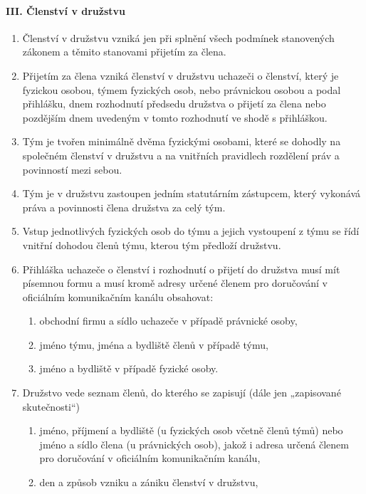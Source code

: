 \paragraph{III. Členství v družstvu}
\begin{enumerate}
    \item Členství v družstvu vzniká jen při splnění všech podmínek stanovených zákonem a těmito stanovami přijetím za člena.
    \item Přijetím za člena vzniká členství v družstvu uchazeči o členství, který je fyzickou osobou, týmem fyzických osob, nebo právnickou osobou a podal přihlášku, dnem rozhodnutí předsedu družstva o přijetí za člena nebo pozdějším dnem uvedeným v tomto rozhodnutí ve shodě s přihláškou.
    \item Tým je tvořen minimálně dvěma fyzickými osobami, které se dohodly na společném členství v družstvu a na vnitřních pravidlech rozdělení práv a povinností mezi sebou.
    \item Tým je v družstvu zastoupen jedním statutárním zástupcem, který vykonává práva a povinnosti člena družstva za celý tým.
    \item Vstup jednotlivých fyzických osob do týmu a jejich vystoupení z týmu se řídí vnitřní dohodou členů týmu, kterou tým předloží družstvu.
    \item Přihláška uchazeče o členství i rozhodnutí o přijetí do družstva musí mít písemnou formu a musí kromě adresy určené členem pro doručování v oficiálním komunikačním kanálu obsahovat:
    \begin{enumerate}[label=\alph*.]
        \item obchodní firmu a sídlo uchazeče v případě právnické osoby,
        \item jméno týmu, jména a bydliště členů v případě týmu,
        \item jméno a bydliště v případě fyzické osoby.
    \end{enumerate}
    \item Družstvo vede seznam členů, do kterého se zapisují (dále jen „zapisované skutečnosti“)
    \begin{enumerate}[label=\alph*.]
        \item jméno, příjmení a bydliště (u fyzických osob včetně členů týmů) nebo jméno a sídlo člena (u právnických osob), jakož i adresa určená členem pro doručování v oficiálním komunikačním kanálu,
        \item den a způsob vzniku a zániku členství v družstvu,

\end{enumerate}
\end{enumerate}

